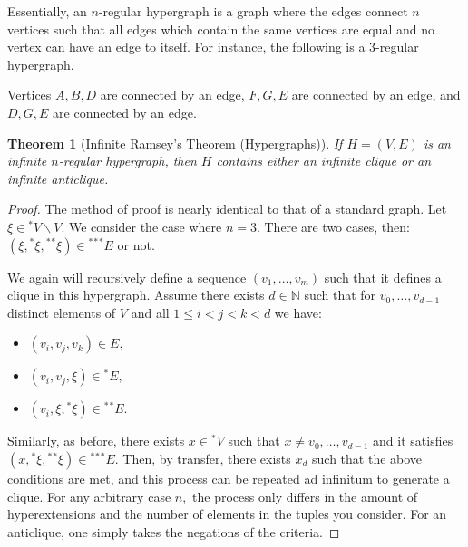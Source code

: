 \documentclass[12pt]{amsart}
\newcommand{\stt}{{}^*}
\newcommand{\NN}{\mathbb{N}}
\theoremstyle{plain}
\newtheorem{thm}{Theorem}
\theoremstyle{definition}
\theoremstyle{remark}
\theoremstyle{theorem}
\numberwithin{equation}{section}
\numberwithin{thm}{section}
\begin{document}
Essentially, an $n$-regular hypergraph is a graph where the edges connect $n$ vertices such that all edges which contain the same vertices are equal and no vertex can have an edge to itself. For instance, the following is a $3$-regular hypergraph.
\begin{center}
\end{center}
Vertices $A,B,D$ are connected by an edge, $F,G,E$ are connected by an edge, and $D,G,E$ are connected by an edge. 
\begin{thm}[Infinite Ramsey's Theorem (Hypergraphs)]
\label{thm:irth} If $H = (V,E)$ is an infinite $n$-regular hypergraph, then $H$ contains either an infinite clique or an infinite anticlique.
\end{thm}
\begin{proof}
The method of proof is nearly identical to that of a standard graph. Let $\xi \in \stt V \backslash V.$ We consider the case where $n = 3.$ There are two cases, then: $(\xi, \stt \xi, \stt \stt \xi) \in \stt \stt \stt E$ or not.

We again will recursively define a sequence $(v_1, \ldots , v_m)$ such that it defines a clique in this hypergraph. Assume there exists $d \in \NN$ such that for $v_0, \ldots , v_{d-1}$ distinct elements of $V$ and all $1 \leq i < j < k < d$ we have:
\begin{itemize}
    \item $(v_i, v_j, v_k) \in E,$
    \item $(v_i, v_j, \xi) \in \stt E,$
    \item $(v_i, \xi, \stt \xi) \in \stt \stt E.$
\end{itemize}
Similarly, as before, there exists $x \in \stt V$ such that $x \neq v_0, \ldots , v_{d-1}$ and it satisfies $(x, \stt \xi, \stt \stt \xi) \in \stt \stt \stt E.$ Then, by transfer, there exists $x_d$ such that the above conditions are met, and this process can be repeated ad infinitum to generate a clique. 
For any arbitrary case $n,$ the process only differs in the amount of hyperextensions and the number of elements in the tuples you consider. For an anticlique, one simply takes the negations of the criteria.
\end{proof}
\end{document}
